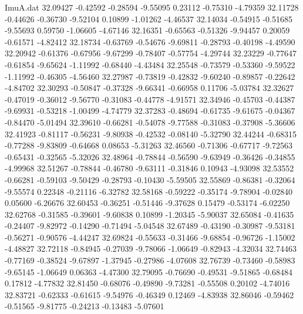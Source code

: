 \begin{filecontents}{ImuA.dat}
  32.09427   -0.42592   -0.28594   -9.55095    0.23112   -0.75310   -4.79359
  32.11728   -0.44626   -0.36730   -9.52104    0.10899   -1.01262   -4.46537
  32.14034   -0.54915   -0.51685   -9.55693    0.59750   -1.06605   -4.67146
  32.16351   -0.65563   -0.51326   -9.94457    0.20059   -0.61571   -4.82412
  32.18734   -0.63769   -0.54676   -9.69811   -0.28793   -0.40198   -4.49590
  32.20942   -0.61376   -0.67956   -9.67299   -0.78407   -0.57754   -4.29744
  32.23229   -0.77647   -0.61854   -9.65624   -1.11992   -0.68440   -4.43484
  32.25548   -0.73579   -0.53360   -9.59522   -1.11992   -0.46305   -4.56460
  32.27987   -0.73819   -0.42832   -9.60240   -0.89857   -0.22642   -4.84702
  32.30293   -0.50847   -0.37328   -9.66341   -0.66958    0.11706   -5.03784
  32.32627   -0.47019   -0.36012   -9.56770   -0.31083   -0.44778   -4.91571
  32.34946   -0.45703   -0.44387   -9.69931   -0.53218   -1.00499   -4.74779
  32.37283   -0.48694   -0.61735   -9.61675   -0.04367   -0.84470   -5.01494
  32.39610   -0.66281   -0.54078   -9.77588   -0.31083   -0.37908   -5.36606
  32.41923   -0.81117   -0.56231   -9.80938   -0.42532   -0.08140   -5.32790
  32.44244   -0.68315   -0.77288   -9.83809   -0.64668    0.08653   -5.31263
  32.46560   -0.71306   -0.67717   -9.72563   -0.65431   -0.32565   -5.32026
  32.48964   -0.78844   -0.56590   -9.63949   -0.36426   -0.34855   -4.99968
  32.51267   -0.78844   -0.46780   -9.63111   -0.31846    0.10943   -4.93098
  32.53552   -0.66281   -0.59103   -9.50429   -0.28793   -0.10430   -5.59505
  32.55869   -0.86381   -0.32064   -9.55574    0.22348   -0.21116   -6.32782
  32.58168   -0.59222   -0.35174   -9.78904   -0.02840    0.05600   -6.26676
  32.60453   -0.36251   -0.51446   -9.37628    0.15479   -0.53174   -6.02250
  32.62768   -0.31585   -0.39601   -9.60838    0.10899   -1.20345   -5.90037
  32.65084   -0.41635   -0.24407   -9.82972   -0.14290   -0.71494   -5.04548
  32.67489   -0.43190   -0.30987   -9.53181   -0.56271   -0.90576   -4.44247
  32.69824   -0.55633   -0.31466   -9.68854   -0.96726   -1.15002   -4.48827
  32.72118   -0.84945   -0.27039   -9.78066   -1.06649   -0.82943   -4.32034
  32.74463   -0.77169   -0.38524   -9.67897   -1.37945   -0.27986   -4.07608
  32.76739   -0.73460   -0.58983   -9.65145   -1.06649    0.06363   -4.47300
  32.79095   -0.76690   -0.49531   -9.51865   -0.68484    0.17812   -4.77832
  32.81450   -0.68076   -0.49890   -9.73281   -0.55508    0.20102   -4.74016
  32.83721   -0.62333   -0.61615   -9.54976   -0.46349    0.12469   -4.83938
  32.86046   -0.59462   -0.51565   -9.81775   -0.24213   -0.13483   -5.07601

\end{filecontents}
